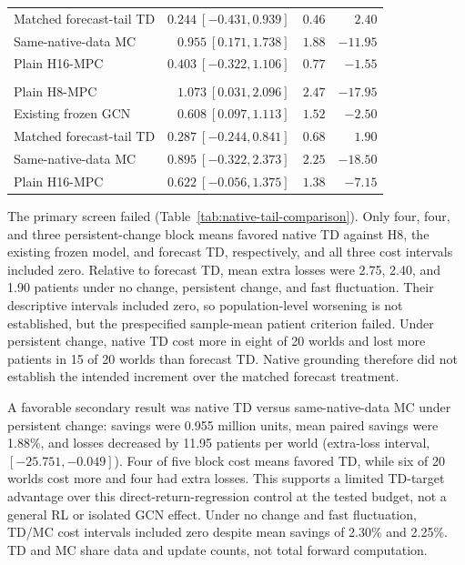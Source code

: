 \documentclass[preprint,review,12pt]{elsarticle}
\begin{document}
\begin{table}[tbp]
\begin{tabularx}{\textwidth}{Xrrr}
Matched forecast-tail TD & $0.244\ [-0.431,0.939]$ & $0.46$ & $2.40$ \\
Same-native-data MC & $0.955\ [0.171,1.738]$ & $1.88$ & $-11.95$ \\
Plain H16-MPC & $0.403\ [-0.322,1.106]$ & $0.77$ & $-1.55$ \\
\addlinespace
\multicolumn{4}{l}{\emph{Fast capacity fluctuation}} \\
Plain H8-MPC & $1.073\ [0.031,2.096]$ & $2.47$ & $-17.95$ \\
Existing frozen GCN & $0.608\ [0.097,1.113]$ & $1.52$ & $-2.50$ \\
Matched forecast-tail TD & $0.287\ [-0.244,0.841]$ & $0.68$ & $1.90$ \\
Same-native-data MC & $0.895\ [-0.322,2.373]$ & $2.25$ & $-18.50$ \\
Plain H16-MPC & $0.622\ [-0.056,1.375]$ & $1.38$ & $-7.15$ \\
\bottomrule
\end{tabularx}
\end{table}

The primary screen failed (Table~\ref{tab:native-tail-comparison}). Only four,
four, and three persistent-change block means favored native TD against H8,
the existing frozen model, and forecast TD, respectively, and all three cost
intervals included zero. Relative to forecast TD, mean extra losses were 2.75,
2.40, and 1.90 patients under no change, persistent change, and fast fluctuation.
Their descriptive intervals included zero, so population-level worsening is
not established, but the prespecified sample-mean patient criterion failed.
Under persistent change, native TD cost more in eight of 20 worlds and lost
more patients in 15 of 20 worlds than forecast TD. Native grounding therefore
did not establish the intended increment over the matched forecast treatment.

A favorable secondary result was native TD versus same-native-data MC under
persistent change: savings were 0.955 million units, mean paired savings were
1.88\%, and losses decreased by 11.95 patients per world (extra-loss interval,
$[-25.751,-0.049]$). Four of five block cost means favored TD, while six of 20
worlds cost more and four had extra losses. This supports a limited TD-target
advantage over this direct-return-regression control at the tested budget,
not a general RL or isolated GCN effect. Under no change and fast fluctuation,
TD/MC cost intervals included zero despite mean savings of 2.30\% and 2.25\%.
TD and MC share data and update counts, not total forward computation.
\end{document}
